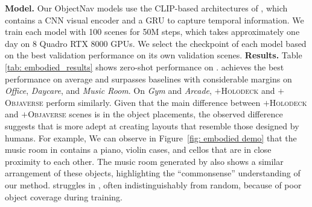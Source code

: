 




\smallbreak
\noindent \textbf{Model.} Our ObjectNav models use the CLIP-based architectures of \cite{khandelwal2022:embodied-clip}, which contains a CNN visual encoder and a GRU to capture temporal information. We train each model with 100 scenes for 50M steps, which takes approximately one day on 8 Quadro RTX 8000 GPUs. We select the checkpoint of each model based on the best validation performance on its own validation scenes.
\smallbreak
\noindent \textbf{Results.} Table \ref{tab: embodied_results} shows zero-shot performance on \noveltythor. \holodeck achieves the best performance on average and surpasses baselines with considerable margins on \textit{Office}, \textit{Daycare}, and \textit{Music Room}. On \emph{Gym} and \emph{Arcade}, $+$\textsc{Holodeck} and $+$\textsc{Objaverse} perform similarly. Given that the main difference between $+$\textsc{Holodeck} and $+$\textsc{Objaverse} scenes is in the object placements, the observed difference suggests that \holodeck is more adept at creating layouts that resemble those designed by humans. For example, We can observe in Figure~\ref{fig: embodied demo} that the music room in \noveltythor contains a piano, violin cases, and cellos that are in close proximity to each other. The music room generated by \holodeck also shows a similar arrangement of these objects, highlighting the ``commonsense'' understanding of our method.
\procthor struggles in \noveltythor, often indistinguishably from random, because of poor object coverage during training.


